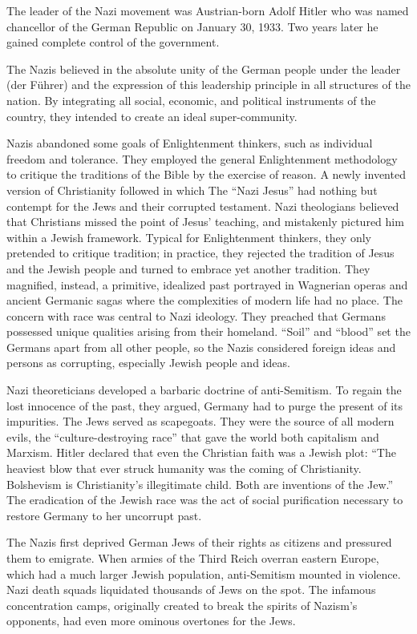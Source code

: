 The leader of the Nazi movement was Austrian-born Adolf Hitler who was named chancellor of the
German Republic on January 30, 1933. Two years later he gained complete control of the government.

The Nazis believed in the absolute unity of the German people under the leader (der Führer) and the
expression of this leadership principle in all structures of the nation. By integrating all social,
economic, and political instruments of the country, they intended to create an ideal
super-community.

Nazis abandoned some goals of Enlightenment thinkers, such as individual freedom and tolerance. They
employed the general Enlightenment methodology to critique the traditions of the Bible by the
exercise of reason. A newly invented version of Christianity followed in which The “Nazi Jesus” had
nothing but contempt for the Jews and their corrupted testament. Nazi theologians believed that
Christians missed the point of Jesus’ teaching, and mistakenly pictured him within a Jewish
framework. Typical for Enlightenment thinkers, they only pretended to critique tradition; in
practice, they rejected the tradition of Jesus and the Jewish people and turned to embrace yet
another tradition. They magnified, instead, a primitive, idealized past portrayed in Wagnerian
operas and ancient Germanic sagas where the complexities of modern life had no place. The concern
with race was central to Nazi ideology. They preached that Germans possessed unique qualities
arising from their homeland. “Soil” and “blood” set the Germans apart from all other people, so the
Nazis considered foreign ideas and persons as corrupting, especially Jewish people and ideas.

Nazi theoreticians developed a barbaric doctrine of anti-Semitism. To regain the lost innocence of
the past, they argued, Germany had to purge the present of its impurities. The Jews served as
scapegoats. They were the source of all modern evils, the “culture-destroying race” that gave the
world both capitalism and Marxism. Hitler declared that even the Christian faith was a Jewish plot:
“The heaviest blow that ever struck humanity was the coming of Christianity. Bolshevism is
Christianity’s illegitimate child. Both are inventions of the Jew.” The eradication of the Jewish
race was the act of social purification necessary to restore Germany to her uncorrupt past.

The Nazis first deprived German Jews of their rights as citizens and pressured them to emigrate.
When armies of the Third Reich overran eastern Europe, which had a much larger Jewish population,
anti-Semitism mounted in violence. Nazi death squads liquidated thousands of Jews on the spot. The
infamous concentration camps, originally created to break the spirits of Nazism’s opponents, had
even more ominous overtones for the Jews.


